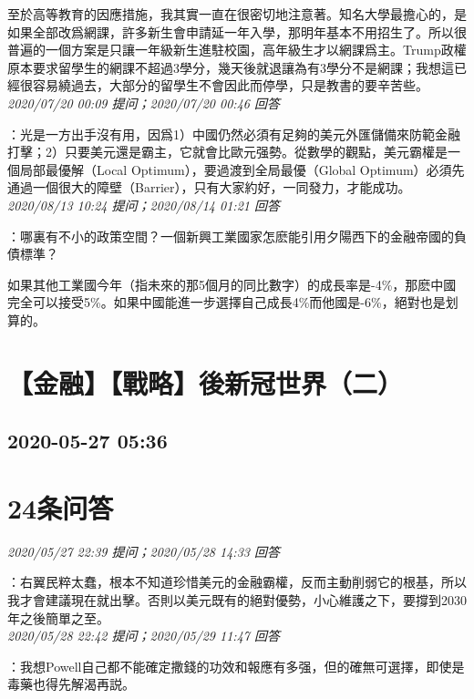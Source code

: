 \documentclass[twocolumn]{ctexart}
\begin{document}
至於高等教育的因應措施，我其實一直在很密切地注意著。知名大學最擔心的，是如果全部改爲網課，許多新生會申請延一年入學，那明年基本不用招生了。所以很普遍的一個方案是只讓一年級新生進駐校園，高年級生才以網課爲主。Trump政權原本要求留學生的網課不超過3學分，幾天後就退讓為有3學分不是網課；我想這已經很容易繞過去，大部分的留學生不會因此而停學，只是教書的要辛苦些。
\\

\textit{\hfill\noindent\small 2020/07/20 00:09 提问；2020/07/20 00:46 回答}

：光是一方出手沒有用，因爲1）中國仍然必須有足夠的美元外匯儲備來防範金融打擊；2）只要美元還是霸主，它就會比歐元强勢。從數學的觀點，美元霸權是一個局部最優解（Local Optimum），要過渡到全局最優（Global Optimum）必須先通過一個很大的障壁（Barrier），只有大家約好，一同發力，才能成功。
\\

\textit{\hfill\noindent\small 2020/08/13 10:24 提问；2020/08/14 01:21 回答}

：哪裏有不小的政策空間？一個新興工業國家怎麽能引用夕陽西下的金融帝國的負債標準？

如果其他工業國今年（指未來的那5個月的同比數字）的成長率是-4\%，那麽中國完全可以接受5\%。如果中國能進一步選擇自己成長4\%而他國是-6\%，絕對也是划算的。
\\


\section{【金融】【戰略】後新冠世界（二）}
\subsection{2020-05-27 05:36}


\section{24条问答}

\textit{\hfill\noindent\small 2020/05/27 22:39 提问；2020/05/28 14:33 回答}

：右翼民粹太蠢，根本不知道珍惜美元的金融霸權，反而主動削弱它的根基，所以我才會建議現在就出擊。否則以美元既有的絕對優勢，小心維護之下，要撐到2030年之後簡單之至。
\\

\textit{\hfill\noindent\small 2020/05/28 22:42 提问；2020/05/29 11:47 回答}

：我想Powell自己都不能確定撒錢的功效和報應有多强，但的確無可選擇，即使是毒藥也得先解渴再説。
\end{document}
